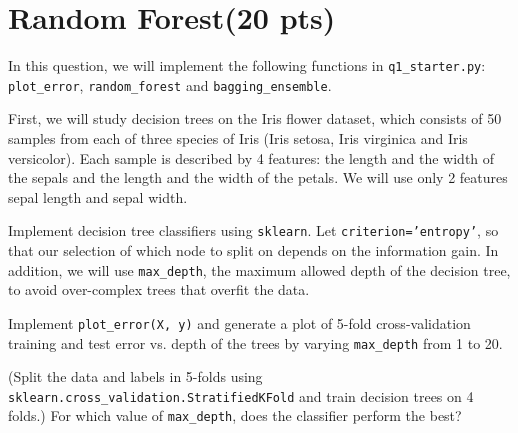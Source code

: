 \section{Random Forest(20 pts)}
In this question, we will implement the following functions in \texttt{q1\_starter.py}: \texttt{plot\_error}, \texttt{random\_forest} and \texttt{bagging\_ensemble}.

\begin{problem}
First, we will study decision trees on the Iris flower dataset, which consists of 50 samples from each of three species of Iris (Iris setosa, Iris virginica and Iris versicolor). Each sample is described by 4 features: the length and the width of the sepals and the length and the width of the petals. We will use only 2 features sepal length and sepal width.

Implement decision tree classifiers using \texttt{sklearn}. Let \texttt{criterion='entropy'}, so that our selection of which node to split on depends on the information gain. In addition, we will use \texttt{max\_depth}, the maximum allowed depth of the decision tree, to avoid over-complex trees that overfit the data. 

Implement \texttt{plot\_error(X, y)} and generate a plot of 5-fold cross-validation training and test error vs. depth of the trees by varying \texttt{max\_depth} from 1 to 20. 

(Split the data and labels in 5-folds using  \texttt{sklearn.cross\_validation.StratifiedKFold} and train decision trees on 4 folds.) For which value of \texttt{max\_depth}, does the classifier perform the best?
\end{problem}

